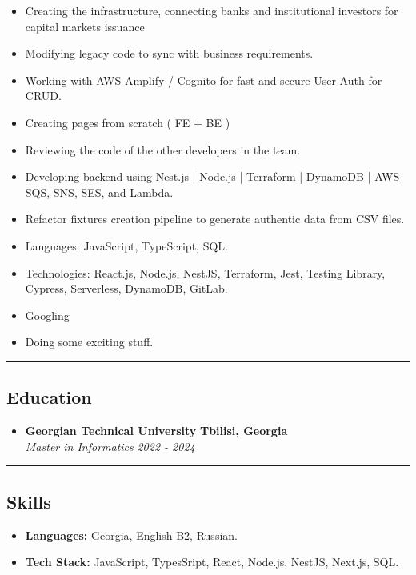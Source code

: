\documentclass[10pt,letterpaper]{article}
\begin{document}
\begin{itemize}
  \begin{itemize}[label=\textbullet]
  \itemsep0.5em
  \item Creating the infrastructure, connecting banks and institutional investors for capital markets issuance
  \item Modifying legacy code to sync with business requirements.
  \item Working with AWS Amplify / Cognito for fast and secure User Auth for CRUD.
  \item Creating pages from scratch ( FE + BE )
  \item Reviewing the code of the other developers in the team.
  \item Developing backend using Nest.js | Node.js | Terraform | DynamoDB | AWS SQS, SNS, SES, and Lambda.
  \item Refactor fixtures creation pipeline to generate authentic data from CSV files.
  \item Languages: JavaScript, TypeScript, SQL.
  \item Technologies: React.js, Node.js, NestJS, Terraform, Jest, Testing Library, Cypress, Serverless, DynamoDB, GitLab.
  \item Googling
  \item Doing some exciting stuff.

  \end{itemize}
  
\end{itemize}

\hrule
\vspace{-1.0em}
\subsection*{Education}
  \begin{itemize}
    \parskip=1em
      \vspace{0.05em}

    \item[]
    {\textbf{Georgian Technical University}}
     \hfill
     \textbf{Tbilisi, Georgia}
    \\
    {\emph{Master in Informatics}
     \hfill
     \emph{2022 - 2024}}
  \end{itemize}

\hrule
\vspace{-1.0em}
\subsection*{Skills}
\begin{itemize}
  \parskip=-0.5em
  \vspace{0.05em}
  \item[] \textbf{Languages:} Georgia, English B2, Russian.
  \vspace{0.5em}
  \item[] \textbf{Tech Stack:} JavaScript, TypesSript, React, Node.js, NestJS, Next.js, SQL.
\end{itemize}
\end{document}
